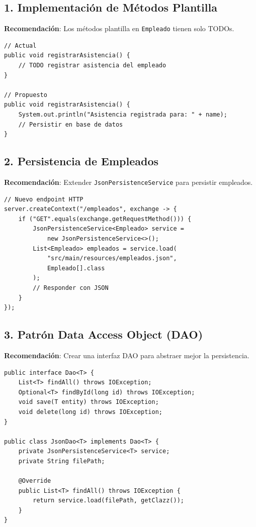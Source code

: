 \documentclass[12pt, a4paper]{report}
\begin{document}
\subsection{1. Implementación de Métodos Plantilla}

\textbf{Recomendación}: Los métodos plantilla en \texttt{Empleado} tienen solo TODOs.

\begin{verbatim}
// Actual
public void registrarAsistencia() {
    // TODO registrar asistencia del empleado
}

// Propuesto
public void registrarAsistencia() {
    System.out.println("Asistencia registrada para: " + name);
    // Persistir en base de datos
}
\end{verbatim}

\subsection{2. Persistencia de Empleados}

\textbf{Recomendación}: Extender \texttt{JsonPersistenceService} para persistir empleados.

\begin{verbatim}
// Nuevo endpoint HTTP
server.createContext("/empleados", exchange -> {
    if ("GET".equals(exchange.getRequestMethod())) {
        JsonPersistenceService<Empleado> service =
            new JsonPersistenceService<>();
        List<Empleado> empleados = service.load(
            "src/main/resources/empleados.json",
            Empleado[].class
        );
        // Responder con JSON
    }
});
\end{verbatim}

\subsection{3. Patrón Data Access Object (DAO)}

\textbf{Recomendación}: Crear una interfaz DAO para abstraer mejor la persistencia.

\begin{verbatim}
public interface Dao<T> {
    List<T> findAll() throws IOException;
    Optional<T> findById(long id) throws IOException;
    void save(T entity) throws IOException;
    void delete(long id) throws IOException;
}

public class JsonDao<T> implements Dao<T> {
    private JsonPersistenceService<T> service;
    private String filePath;

    @Override
    public List<T> findAll() throws IOException {
        return service.load(filePath, getClazz());
    }
}
\end{verbatim}
\end{document}
